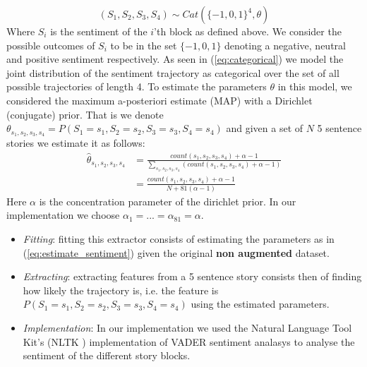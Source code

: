 \documentclass{article}
\begin{document}
\begin{equation}
\label{eq:categorical}
(S_1, S_2,S_3,S_4) \sim Cat(\{-1,0,1\}^4, \theta)
\end{equation}
Where $S_i$ is the sentiment of the $i$'th block as defined above. We consider the possible outcomes of $S_i$ to be in the set $\{-1,0,1\}$ denoting a negative, neutral and positive sentiment respectively.  As seen in (\ref{eq:categorical}) we model the joint distribution of the sentiment trajectory as categorical over the set of all possible trajectories of length 4. To estimate the parameters $\theta$ in this model, we considered the maximum a-posteriori estimate (MAP) with a Dirichlet (conjugate) prior. That is we denote $\theta_{s_1,s_2,s_3,s_4} = P(S_1 = s_1, S_2=s_2, S_3=s_3, S_4=s_4)$ and given a set of $N$ 5 sentence stories we estimate it as follows:
\begin{equation}
\label{eq:estimate_sentiment}
\begin{split}
\hat{\theta}_{s_1,s_2,s_3,s_4} &= \frac{count(s_1,s_2,s_3,s_4) + \alpha - 1}{\sum\limits_{s_1,s_2,s_3,s_4}(count(s_1,s_2,s_3,s_4) + \alpha-1) }\\
&=\frac{count(s_1,s_2,s_3,s_4) + \alpha - 1}{N + 81(\alpha-1) }
\end{split}
\end{equation}
Here $\alpha$ is the concentration parameter of the dirichlet prior. In our implementation we choose $\alpha_1 = ... = \alpha_{81} = \alpha$.
\begin{itemize}
	\item \textit{Fitting}: fitting this extractor consists of estimating the parameters as in (\ref{eq:estimate_sentiment}) given the original \textbf{non augmented} dataset.
	\item \textit{Extracting}: extracting features from a 5 sentence story consists then of finding how likely the trajectory is, i.e. the feature is $P(S_1 = s_1, S_2=s_2, S_3=s_3, S_4=s_4)$ using the estimated parameters.
	\item \textit{Implementation}: In our implementation we used the Natural Language Tool Kit's (NLTK \cite{NLTK_VADER}) implementation of VADER sentiment analasys \cite{VADER} to analyse the sentiment of the different story blocks.
\end{itemize}
\end{document}
